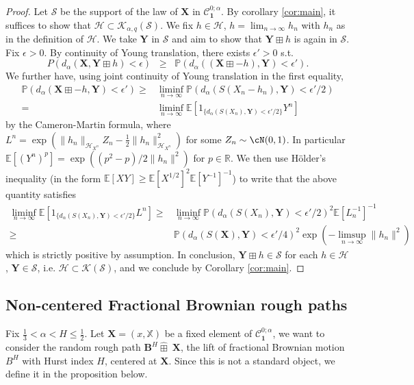 \documentclass[12pt,a4paper]{article}
\numberwithin{equation}{section}
\def\cH{\mathcal{H}}\def\cI{\mathcal{I}}
\def\cK{\mathcal{K}}\def\cC{\mathcal{C}}
\def\bR{\mathbb{R}}\def\bS{\mathbb{S}}
\def\bE{\mathbb{E}}\def\bW{\mathbb{W}}
\def\bP{\mathbb{P}}\def\bU{\mathbb{U}}
\def\fX{\mathbf{X}}
\def\fB{\mathbf{B}}
\theoremstyle{plain}
\theoremstyle{definition}
\theoremstyle{remark}
\begin{document}
\begin{proof}
Let $\mathcal{S}$ be the support of the law of $\mathbf{X}$ in $\mathcal{C}^{0;\alpha}_{\mathbf{1}}$. By corollary \ref{cor:main}, it suffices to show that $\cH \subset \cK_{\alpha,q}(\mathcal{S})$. We fix $h \in \cH$, $h = \lim_{n \to \infty} h_n$ with $h_n$ as in the definition of $\mathcal{H}$. We take $\mathbf{Y}$ in $\mathcal{S}$ and aim to show that $\mathbf{Y}\boxplus h$ is again in $\mathcal{S}$. Fix $\epsilon >0$. By continuity of Young translation, there exists $\epsilon'>0$ s.t.
\[
P(d_{\alpha}(\mathbf{X},\mathbf{Y}\boxplus h) < \epsilon)\;\; \geq \;\;\bP(d_{\alpha}((\mathbf{X}\boxplus -h),\mathbf{Y}) < \epsilon').
\]
We further have, using joint continuity of Young translation in the first equality,
 \begin{align*}
\bP(d_{\alpha}(\mathbf{X}\boxplus -h,\mathbf{Y}) < \epsilon')\geq  & \liminf_{n \to \infty}\bP(d_{\alpha}(S(X_n-h_n),\mathbf{Y}) < \epsilon'/2)  \\
= & \liminf_{n \to \infty} \bE \left[ 1_{\{d_{\alpha}(S(X_n),\mathbf{Y}) < \epsilon'/2\}} Y^n \right] 
\end{align*}
by the Cameron-Martin formula, where $L^n= \exp( \|h_n\|_{\cH_{X^n}} Z_n - \frac{1}{2}  \|h_n\|_{\cH_{X^n}}^2)$ for some $Z_n \sim \cN(0,1)$. In particular $\bE[(Y^n)^{p}] = \exp((p^2-p)/2 \|h_n\|^2)$ for $p \in \bR$. We then use H\"older's inequality (in the form $\bE[XY] \geq \bE[X^{1/2}]^2 \bE[Y^{-1}]^{-1}$) to write that the above quantity satisfies
\begin{align*}
\liminf_{n \to \infty} \bE \left[ 1_{\{d_{\alpha}(S(X_n),\mathbf{Y}) < \epsilon'/2\}} L^n \right] \geq& \liminf_{n \to \infty}\bP(d_{\alpha}(S(X_n),\mathbf{Y}) < \epsilon'/2)^2 \bE[L_n^{-1}]^{-1} \\
\geq&\bP(d_{\alpha}(S(\mathbf{X}),\mathbf{Y}) < \epsilon'/4)^2 \exp( -  \limsup_{n \to \infty}\|h_n\|^2)
\end{align*}
which is strictly positive by assumption. In conclusion, $\mathbf{Y}\boxplus h \in \mathcal{S}$ for each $h \in \cH$, $\mathbf{Y} \in \mathcal{S}$, i.e. $\cH \subset \cK(\mathcal{S})$, and we conclude by Corollary \ref{cor:main}.
\end{proof}

\subsection*{Non-centered Fractional Brownian rough paths}

Fix $\frac 1 3 < \alpha < H \leq \frac 1 2$. Let $\fX=(x,\mathbb X)$ be a fixed element of $\mathcal{C}^{0;\alpha}_{\mathbf{1}}$, we want to consider the random rough path $\fB^H \widehat{\boxplus}\;  \fX$, the lift of fractional Brownian motion $B^H$ with Hurst index $H$, centered at $\fX$. Since this is not a standard object, we define it in the proposition below.
 
\end{document}
